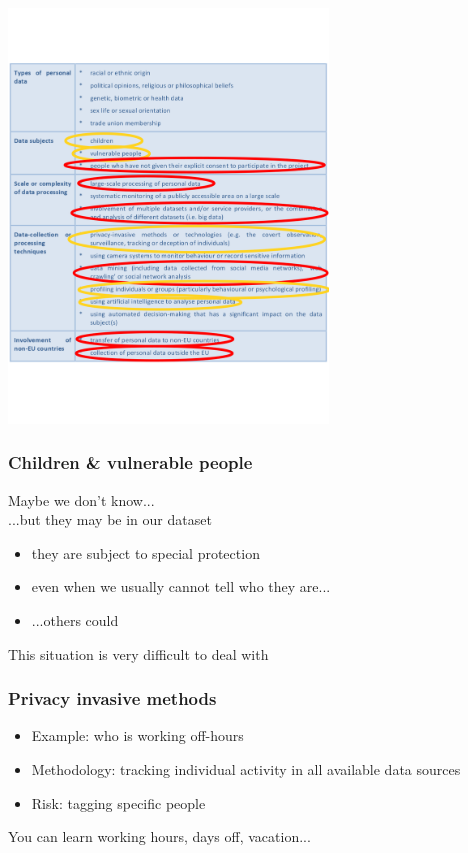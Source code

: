 \documentclass[17pt,aspectratio=169,hyperref={pdfusetitle,colorlinks,allcolors=olive}]{beamer}
\begin{document}
\begin{frame}[fragile]
  \vspace{-1.6cm}
  \begin{center}
    \includegraphics[height=11cm]{figs/gdpr-higher-risks-annotated}
  \end{center}
\end{frame}

\begin{frame}[fragile]
  \frametitle{Children \& vulnerable people}

  Maybe we don't know...\\
  ...but they may be in our dataset\\
  
  \begin{itemize}
  \item they are subject to special protection
  \item even when we usually cannot tell who they are...
  \item ...others could
  \end{itemize}

  This situation is very difficult to deal with
\end{frame}

\begin{frame}[fragile]
  \frametitle{Privacy invasive methods}

  \begin{itemize}
  \item Example: who is working off-hours

  \item Methodology: tracking individual activity in all available data sources

  \item Risk: tagging specific people
  \end{itemize}
  
  \begin{flushright}
    You can learn working hours, days off, vacation...
  \end{flushright}
\end{frame}
\end{document}
